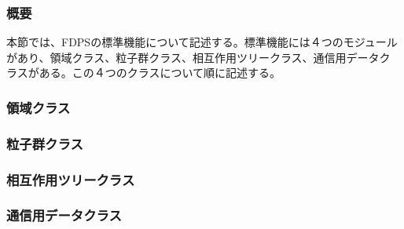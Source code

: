 \subsubsection{概要}

本節では、FDPSの標準機能について記述する。標準機能には４つのモジュール
があり、領域クラス、粒子群クラス、相互作用ツリークラス、通信用データク
ラスがある。この４つのクラスについて順に記述する。

\subsubsection{領域クラス}



\subsubsection{粒子群クラス}



\subsubsection{相互作用ツリークラス}



\subsubsection{通信用データクラス}



